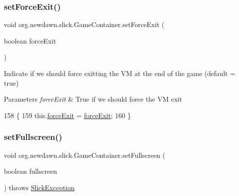 \subsubsection{\texorpdfstring{set\+Force\+Exit()}{setForceExit()}}
{\footnotesize\ttfamily void org.\+newdawn.\+slick.\+Game\+Container.\+set\+Force\+Exit (\begin{DoxyParamCaption}\item[{boolean}]{force\+Exit }\end{DoxyParamCaption})\hspace{0.3cm}{\ttfamily [inline]}}

Indicate if we should force exitting the VM at the end of the game (default = true)


\begin{DoxyParams}{Parameters}
{\em force\+Exit} & True if we should force the VM exit \\
\hline
\end{DoxyParams}

\begin{DoxyCode}
158                                                 \{
159         this.\mbox{\hyperlink{classorg_1_1newdawn_1_1slick_1_1_game_container_afda255df5a0dc9c1a22e5a169c0176c5}{forceExit}} = \mbox{\hyperlink{classorg_1_1newdawn_1_1slick_1_1_game_container_afda255df5a0dc9c1a22e5a169c0176c5}{forceExit}};
160     \}
\end{DoxyCode}
\mbox{\label{classorg_1_1newdawn_1_1slick_1_1_game_container_aa658465ec67e57442201b1d72d24ac04}} 
\subsubsection{\texorpdfstring{set\+Fullscreen()}{setFullscreen()}}
{\footnotesize\ttfamily void org.\+newdawn.\+slick.\+Game\+Container.\+set\+Fullscreen (\begin{DoxyParamCaption}\item[{boolean}]{fullscreen }\end{DoxyParamCaption}) throws \mbox{\hyperlink{classorg_1_1newdawn_1_1slick_1_1_slick_exception}{Slick\+Exception}}\hspace{0.3cm}{\ttfamily [inline]}}

